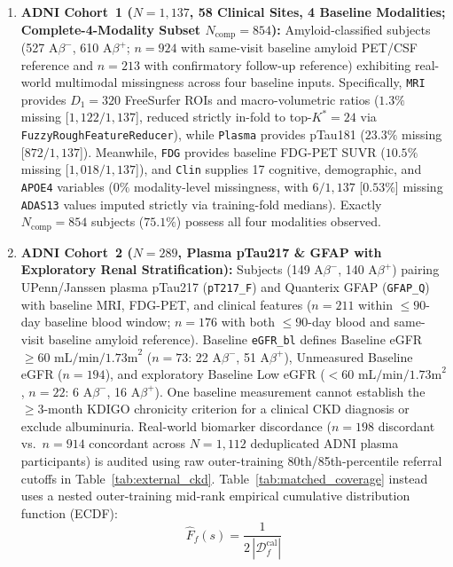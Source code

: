 \documentclass[10pt,twocolumn]{article}
\begin{document}
\begin{enumerate}[leftmargin=1.4em,itemsep=1pt,topsep=2pt]
    \item \textbf{ADNI Cohort~1 ($N=1,137$, 58 Clinical Sites, 4 Baseline Modalities;
    Complete-4-Modality Subset $N_{\text{comp}}=854$):}
    Amyloid-classified subjects (527 A$\beta^-$, 610 A$\beta^+$; $n=924$ with same-visit
    baseline amyloid PET/CSF reference and $n=213$ with confirmatory follow-up reference)
    exhibiting real-world multimodal missingness across four baseline inputs. Specifically,
    \texttt{MRI} provides $D_1 = 320$ FreeSurfer ROIs and macro-volumetric ratios ($1.3\%$
    missing [$1,122/1,137$], reduced strictly in-fold to top-$K^*=24$ via
    \texttt{FuzzyRoughFeatureReducer}), while \texttt{Plasma} provides pTau181 ($23.3\%$
    missing [$872/1,137$]). Meanwhile, \texttt{FDG} provides baseline FDG-PET SUVR ($10.5\%$
    missing [$1,018/1,137$]), and \texttt{Clin} supplies 17 cognitive, demographic, and
    \texttt{APOE4} variables ($0\%$ modality-level missingness, with $6/1,137$ [$0.53\%$]
    missing \texttt{ADAS13} values imputed strictly via training-fold medians). Exactly
    $N_{\text{comp}}=854$ subjects ($75.1\%$) possess all four modalities observed.
    \item \textbf{ADNI Cohort~2 ($N=289$, Plasma pTau217 \& GFAP with Exploratory Renal
    Stratification):} Subjects (149 A$\beta^-$, 140 A$\beta^+$) pairing UPenn/Janssen plasma
    pTau217 (\texttt{pT217\_F}) and Quanterix GFAP (\texttt{GFAP\_Q}) with baseline MRI,
    FDG-PET, and clinical features ($n=211$ within $\le 90$-day baseline blood window; $n=176$
    with both $\le 90$-day blood and same-visit baseline amyloid reference). Baseline
    \texttt{eGFR\_bl} defines Baseline eGFR $\ge 60\text{ mL/min/1.73m}^2$ ($n=73$: 22
    A$\beta^-$, 51 A$\beta^+$), Unmeasured Baseline eGFR ($n=194$), and exploratory Baseline
    Low eGFR ($<60\text{ mL/min/1.73m}^2$, $n=22$: 6 A$\beta^-$, 16 A$\beta^+$).
    One baseline measurement cannot establish the $\ge 3$-month KDIGO chronicity criterion
    for a clinical CKD diagnosis or exclude albuminuria. Real-world biomarker discordance
    ($n=198$ discordant vs.\ $n=914$ concordant across $N=1,112$ deduplicated ADNI plasma
    participants) is audited using raw outer-training 80th/85th-percentile referral cutoffs
    in Table~\ref{tab:external_ckd}. Table~\ref{tab:matched_coverage} instead uses a nested
    outer-training mid-rank empirical cumulative distribution function (ECDF):
    \[
    \widehat{F}_f(s) = \frac{1}{2\,|\mathcal{D}_f^{\text{cal}}|}
\]
\end{enumerate}
\end{document}
